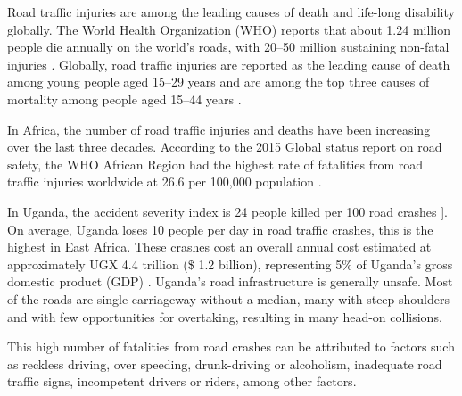 \documentclass[12pt]{report}
\begin{document}
Road traffic injuries are among the leading causes of death and life-long disability globally. The World Health Organization (WHO) reports that about 1.24 million people die annually on the world’s roads, with 20–50 million sustaining non-fatal injuries \cite{systematic}. Globally, road traffic injuries are reported as the leading cause of death among young people aged 15–29 years and are among the top three causes of mortality among people aged 15–44 years \cite{systematic}.

In Africa, the number of road traffic injuries and deaths have been increasing over the last three decades. According to the 2015 Global status report on road safety, the WHO African Region had the highest rate of fatalities from road traffic injuries worldwide at 26.6 per 100,000 population \cite{systematic}.

In Uganda, the accident severity index is 24 people killed per 100 road crashes \cite{road}]. On average, Uganda loses 10 people per day in road traffic crashes, this is the highest in East Africa. These crashes cost an overall annual cost estimated at approximately UGX 4.4 trillion (\$ 1.2 billion), representing 5\% of Uganda’s gross domestic product (GDP) \cite{road}. Uganda’s road infrastructure is generally unsafe. Most of the roads are single carriageway without a median, many with steep shoulders and with few opportunities for overtaking, resulting in many head-on collisions.

This high number of fatalities from road crashes can be attributed to factors such as reckless driving, over speeding, drunk-driving or alcoholism, inadequate road traffic signs, incompetent 
drivers or riders, among other factors.
\end{document}
